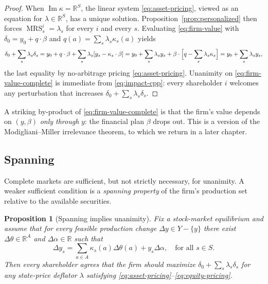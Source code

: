 \documentclass[11pt,a4paper,oneside]{book}
\def\R{\mathbb{R}}
\DeclareMathOperator{\MRS}{MRS}
\DeclareMathOperator{\Range}{Im}
\theoremstyle{plain}
\newtheorem{proposition}[theorem]{Proposition}
\theoremstyle{definition}
\theoremstyle{remark}
\numberwithin{equation}{chapter}
\begin{document}
\begin{proof}
When $\Range \kappa = \R^S$, the linear system \eqref{eq:asset-pricing}, viewed as an equation for $\lambda \in \R^S$, has a unique solution.
Proposition~\ref{prop:personalized} then forces $\MRS^i_s = \lambda_s$ for every $i$ and every $s$.
Evaluating \eqref{eq:firm-value} with $\delta_0 = y_0 + q \cdot \beta$ and $q(a) = \sum_s \lambda_s \kappa_s(a)$ yields
\begin{equation*}
  \delta_0 + \sum_s \lambda_s \delta_s
  = y_0 + q \cdot \beta + \sum_s \lambda_s [y_s - \kappa_s \cdot \beta]
  = y_0 + \sum_s \lambda_s y_s + \beta \cdot \Bigl[ q - \sum_s \lambda_s \kappa_s \Bigr]
  = y_0 + \sum_s \lambda_s y_s,
\end{equation*}
the last equality by no-arbitrage pricing \eqref{eq:asset-pricing}.
Unanimity on \eqref{eq:firm-value-complete} is immediate from \eqref{eq:impact-cpp}: every shareholder $i$ welcomes any perturbation that increases $\delta_0 + \sum_s \lambda_s \delta_s$.
\end{proof}

A striking by-product of \eqref{eq:firm-value-complete} is that the firm's value depends on $(y, \beta)$ \emph{only through} $y$: the financial plan $\beta$ drops out.
This is a version of the Modigliani--Miller irrelevance theorem, to which we return in a later chapter.

\subsection{Spanning}

Complete markets are sufficient, but not strictly necessary, for unanimity.
A weaker sufficient condition is a \emph{spanning property} of the firm's production set relative to the available securities.

\begin{proposition}[Spanning implies unanimity]\label{prop:spanning}
Fix a stock-market equilibrium and assume that for every feasible production change $\Delta y \in Y - \{ y \}$ there exist $\Delta \theta \in \R^A$ and $\Delta \alpha \in \R$ such that
\begin{equation}\label{eq:spanning}
  \Delta y_s = \sum_{a \in A} \kappa_s(a) \Delta \theta(a) + y_s \Delta \alpha,
  \quad \text{for all $s\in S$}.
\end{equation}
Then every shareholder agrees that the firm should maximize $\delta_0 + \sum_s \lambda_s \delta_s$ for \emph{any} state-price deflator $\lambda$ satisfying \eqref{eq:asset-pricing}--\eqref{eq:equity-pricing}.
\end{proposition}
\end{document}
